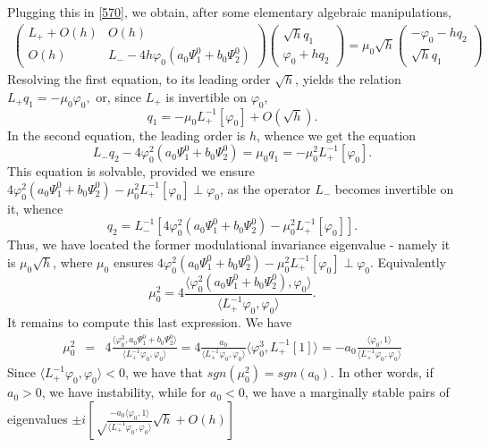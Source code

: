 \documentclass[12pt]{amsart}
\theoremstyle{definition}
\theoremstyle{remark}
\numberwithin{equation}{section}
\renewcommand{\(}{\left(}
\renewcommand{\)}{\right)}
\renewcommand{\[}{\left[}
\renewcommand{\]}{\right]}
\newcommand{\f}[2]{\frac{#1}{#2}}
\newcommand{\vp}{\varphi}
\newcommand{\dpr}[2]{\langle #1,#2 \rangle}
\begin{document}
Plugging this in \eqref{570}, we obtain, after some elementary algebraic manipulations,
\begin{eqnarray*}
 \left(\begin{array}{cc}
L_+ +O(h)  &   O(h)  \\
O(h)    &  L_-  - 4 h \vp_0 (a_0 \Psi_1^0+b_0 \Psi_2^0)
\end{array}
\right)  \left(\begin{array}{c}
 \sqrt{h} q_1  \\ \vp_0+h q_2
\end{array}\right)=\mu_0 \sqrt{h}
\left(\begin{array}{c} -\vp_0-h q_2 \\
	\sqrt{h} q_1
	\end{array} \right)
\end{eqnarray*}
Resolving the first equation, to its leading order $\sqrt{h}$,  yields the relation
$
L_+ q_1 = -\mu_0 \vp_0,
$
or, since $L_+$ is invertible on $\vp_0$,
\begin{equation}
\label{598}
q_1=-\mu_0 L_+^{-1}[\vp_0]+O(\sqrt{h}).
\end{equation}
In the second equation, the leading order is $h$, whence we get the equation
\begin{equation}
\label{600}
L_- q_2 - 4  \vp_0^2(a_0 \Psi_1^0+b_0 \Psi_2^0) = \mu_0 q_1= -\mu_0^2  L_+^{-1}[\vp_0].
\end{equation}
This equation is solvable, provided we ensure $4  \vp_0^2(a_0 \Psi_1^0+b_0 \Psi_2^0)  - \mu_0^2  L_+^{-1}[\vp_0]\perp \vp_0$, as the operator $L_-$ becomes invertible on it, whence
$$
q_2=L_-^{-1}[4  \vp_0^2(a_0 \Psi_1^0+b_0 \Psi_2^0)  - \mu_0^2  L_+^{-1}[\vp_0]].
$$
Thus, we have located the former modulational invariance eigenvalue - namely it is $\mu_0 \sqrt{h}$,
where $\mu_0$ ensures $4  \vp_0^2(a_0 \Psi_1^0+b_0 \Psi_2^0)  - \mu_0^2  L_+^{-1}[\vp_0]\perp \vp_0$.
Equivalently
\begin{equation}
\label{610}
\mu_0^2 = 4 \f{\dpr{\vp_0^2(a_0 \Psi_1^0+b_0 \Psi_2^0)}{\vp_0}}{\dpr{L_+^{-1}\vp_0}{\vp_0}}.
\end{equation}
It remains to compute this last expression. We have
\begin{eqnarray*}
\mu_0^2 &=& 4\f{\dpr{\vp_0^3}{a_0 \Psi_1^0+b_0 \Psi_2^0}}{\dpr{L_+^{-1}\vp_0}{\vp_0}}=
4 \f{a_0}{ \dpr{L_+^{-1}\vp_0}{\vp_0}} \dpr{\vp_0^3}{L_+^{-1}[1]}=  -a_0  \f{\dpr{\vp_0}{1}}{\dpr{L_+^{-1}\vp_0}{\vp_0}}
\end{eqnarray*}
Since $\dpr{L_+^{-1}\vp_0}{\vp_0}<0$, we have that $sgn(\mu_0^2)=sgn(a_0)$. In other words, if $a_0>0$, we have instability, while for $a_0<0$, we have a marginally stable pairs of eigenvalues
$\pm i [\sqrt  \f{-a_0 \dpr{\vp_0}{1}}{\dpr{L_+^{-1}\vp_0}{\vp_0}} \sqrt{h}+O(h)]$
\end{document}

